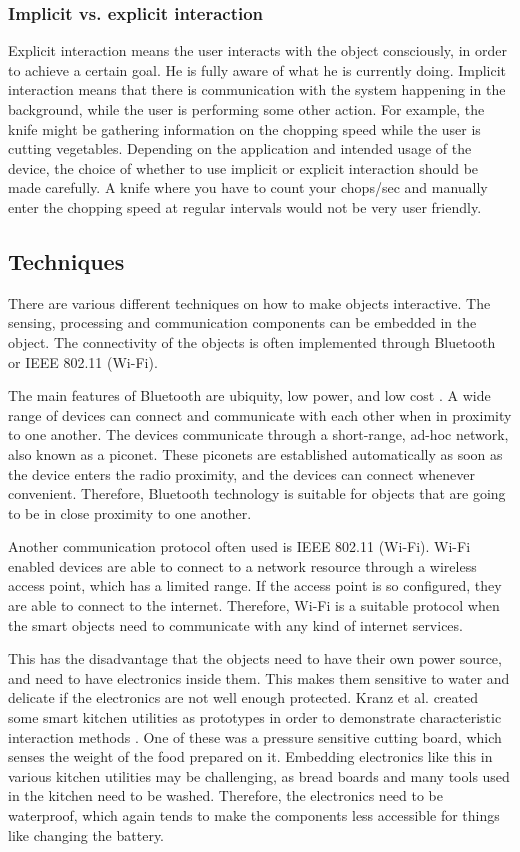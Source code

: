 \subsubsection{Implicit vs. explicit interaction}
Explicit interaction means the user interacts with the object consciously, in order to achieve a certain goal.
He is fully aware of what he is currently doing.
Implicit interaction means that there is communication with the system happening in the background, while the user is performing some other action.
For example, the knife might be gathering information on the chopping speed while the user is cutting vegetables. Depending on the application and intended usage of the device, the choice of whether to use implicit or explicit interaction should be made carefully.
A knife where you have to count your chops/sec and manually enter the chopping speed at regular intervals would not be very user friendly.

\subsection{Techniques}
\label{sec:techniques}
There are various different techniques on how to make objects interactive. 
The sensing, processing and communication components can be embedded in the object.
The connectivity of the objects is often implemented through Bluetooth \cite{bluetoothPatent} or IEEE 802.11 (Wi-Fi).

The main features of Bluetooth are ubiquity, low power, and low cost \cite{btbasics}.
A wide range of devices can connect and communicate with each other when in proximity to one another.
The devices communicate through a short-range, ad-hoc network, also known as a piconet.
These piconets are established automatically as soon as the device enters the radio proximity, and the devices can connect whenever convenient.
Therefore, Bluetooth technology is suitable for objects that are going to be in close proximity to one another. 

Another communication protocol often used is IEEE 802.11 (Wi-Fi).
Wi-Fi enabled devices are able to connect to a network resource through a wireless access point, which has a limited range.
If the access point is so configured, they are able to connect to the internet.
Therefore, Wi-Fi is a suitable protocol when the smart objects need to communicate with any kind of internet services.

This has the disadvantage that the objects need to have their own power source, and need to have electronics inside them.
This makes them sensitive to water and delicate if the electronics are not well enough protected.
Kranz et al. created some smart kitchen utilities as prototypes in order to demonstrate characteristic interaction methods \cite{kranz10}. 
One of these was a pressure sensitive cutting board, which senses the weight of the food prepared on it. 
Embedding electronics like this in various kitchen utilities may be challenging, as bread boards and many tools used in the kitchen need to be washed. 
Therefore, the electronics need to be waterproof, which again tends to make the components less accessible for things like changing the battery.

